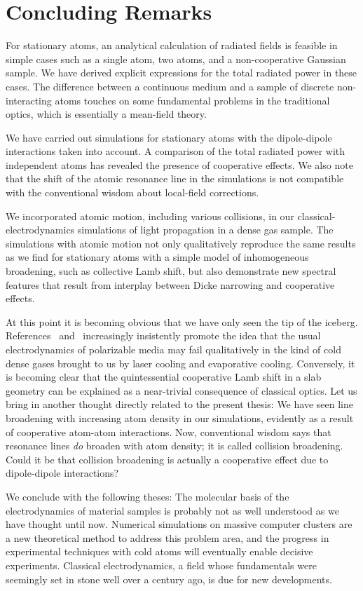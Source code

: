\chapter{Concluding Remarks}
For stationary atoms, an analytical calculation of radiated fields is feasible in simple cases such as a single atom, two atoms, and a non-cooperative Gaussian sample. We have derived explicit expressions for the total radiated power in these cases. The difference between a continuous medium and a sample of discrete non-interacting atoms touches on some fundamental problems in the traditional optics, which is essentially a mean-field theory.

We have carried out simulations for stationary atoms with the dipole-dipole interactions taken into account. A comparison of the total radiated power with independent atoms has revealed the presence of cooperative effects. We also note that the shift of the atomic resonance line in the simulations is not compatible with the conventional wisdom about local-field corrections.

We incorporated atomic motion, including various collisions, in our classical-electrodynamics simulations of light propagation in a dense gas sample. The simulations with atomic motion not only qualitatively reproduce the same results as we find for stationary atoms with a simple model of inhomogeneous broadening, such as collective Lamb shift, but also demonstrate new spectral features that result from interplay between Dicke narrowing and cooperative effects.

At this point it is becoming obvious that we have only seen the tip of the iceberg. 
References~\cite{PhysRevLett.112.113603} and~\cite{Javanainen:16} increasingly insistently promote the idea that the usual electrodynamics of polarizable media may fail qualitatively in the kind of cold dense gases brought to us by laser cooling and evaporative cooling. Conversely, it is becoming clear that the quintessential cooperative Lamb shift in a slab geometry can be explained as a near-trivial consequence of classical optics. Let us bring in another thought directly related to the present thesis: We have seen line broadening with increasing atom density in our simulations, evidently as a result of cooperative atom-atom interactions. Now, conventional wisdom says that resonance lines {\em do\/} broaden with atom density; it is called collision broadening. Could it be that collision broadening is actually a cooperative effect due to dipole-dipole interactions?

We conclude with the following theses: The molecular basis of the electrodynamics of material samples is probably not as well understood as we have thought until now. Numerical simulations on massive computer clusters are a new theoretical method to address this problem area, and the progress in experimental techniques with cold atoms will eventually enable decisive experiments. Classical electrodynamics, a field whose fundamentals were seemingly set in stone well over a century ago, is due for new developments.
